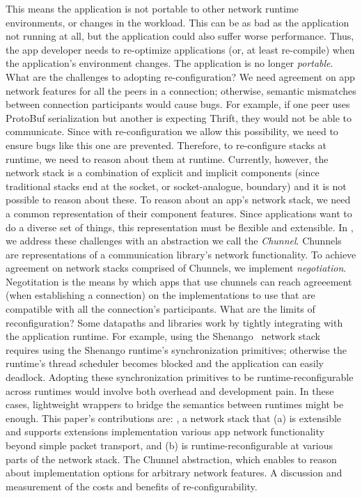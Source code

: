 \begin{outline}
    \2 This means the application is not portable to other network runtime environments, or changes in the workload. This can be as bad as the application not running at all, but the application could also suffer worse performance.
    \2 Thus, the app developer needs to re-optimize applications (or, at least re-compile) when the application's environment changes. The application is no longer \emph{portable}.
\1 What are the challenges to adopting re-configuration?
  \2 We need agreement on app network features for all the peers in a connection; otherwise, semantic mismatches between connection participants would cause bugs. 
    \3 For example, if one peer uses ProtoBuf serialization but another is expecting Thrift, they would not be able to communicate. Since with re-configuration we allow this possibility, we need to ensure bugs like this one are prevented.
  \2 Therefore, to re-configure stacks at runtime, we need to reason about them at runtime. Currently, however, the network stack is a combination of explicit and implicit components (since traditional stacks end at the socket, or socket-analogue, boundary) and it is not possible to reason about these.
  \2 To reason about an app's network stack, we need a common representation of their component features. Since applications want to do a diverse set of things, this representation must be flexible and extensible.
\1 In \name{}, we address these challenges with an abstraction we call the \emph{Chunnel}. Chunnels are representations of a communication library's network functionality.
  \2 To achieve agreement on network stacks comprised of Chunnels, we implement \emph{negotiation}. Negotitation is the means by which apps that use chunnels can reach agreeement (when establishing a connection) on the implementations to use that are compatible with all the connection's participants.
\1 What are the limits of reconfiguration?
  \2 Some datapaths and libraries work by tightly integrating with the application runtime. For example, using the Shenango~\cite{shenango} network stack requires using the Shenango runtime's synchronization primitives; otherwise the runtime's thread scheduler becomes blocked and the application can easily deadlock.
  \2 Adopting these synchronization primitives to be runtime-reconfigurable across runtimes would involve both overhead and development pain. In these cases, lightweight wrappers to bridge the semantics between runtimes might be enough.
\1 This paper's contributions are:
  \2 \name{}, a network stack that (a) is extensible and supports extensions implementation various app network functionality beyond simple packet transport, and (b) is runtime-reconfigurable at various parts of the network stack.
  \2 The Chunnel abstraction, which enables \name{} to reason about implementation options for arbitrary network features.
  \2 A discussion and measurement of the costs and benefits of re-configurability.
\end{outline}
